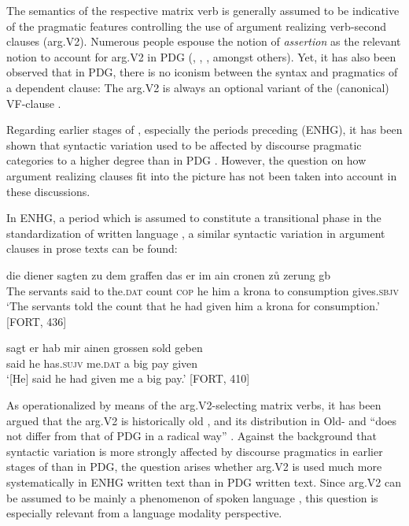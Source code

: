 \documentclass[output=paper,colorlinks,citecolor=brown]{langscibook}
\begin{document}
The semantics of the respective matrix verb is generally assumed to be indicative of the pragmatic features controlling the use of argument realizing verb-second clauses (arg.V2). Numerous people espouse the notion of \textit{assertion} as the relevant notion to account for arg.V2 in PDG (\citealt{Reis1997}, \citealt{Auer1998}, \citealt{Gärtner2002}, \citealt{Meinunger2006} amongst others). Yet, it has also been observed that in PDG, there is no iconism between the syntax and pragmatics of a dependent clause: The arg.V2 is always an optional variant of the  (canonical) VF-clause \citep{Reis1997}.

Regarding earlier stages of , especially the periods preceding  (ENHG), it has been shown that syntactic variation used to be affected by discourse pragmatic categories to a higher degree than in PDG \citep{hinterholzl2010v1, speyer2010}. However, the question on how argument realizing clauses fit into the picture has not been taken into account in these discussions.

In ENHG, a period which is assumed to constitute a transitional phase in the standardization of  written language \citep{Betten2000, polenz2000}, a similar syntactic variation in argument clauses in prose texts can be found: 

\ea
\ea \label{ex:reetz:3}
\gll die diener sagten zu dem graffen das er im ain cronen zů zerung g\oldae{}b  \\
     The servants said to the.\textsc{dat} count \textsc{cop} he him a krona to consumption gives.\textsc{sbjv}\\
\glt `The servants told the count that he had given him a krona for consumption.' \hfill [FORT, 436]

\ex \label{ex:reetz:4}
\gll sagt er hab mir ainen grossen sold geben\\
     said he has.\textsc{sujv} me.\textsc{dat} a big pay given\\
\glt `[He] said he had given me a big pay.' \hfill [FORT, 410]
\z
\z

As operationalized by means of the arg.V2-selecting matrix verbs, it has been argued that the arg.V2 is historically old \citep{Axel2012}, and its distribution in Old- and  “does not differ from that of PDG in a radical way” \citep[556]{Petrova2020a}. Against the background that syntactic variation is more strongly affected by discourse pragmatics in earlier stages of  than in PDG, the question arises whether arg.V2 is used much more systematically in ENHG written text than in PDG written text. Since arg.V2 can be assumed to be mainly a phenomenon of spoken language \citep{Auer1998}, this question is especially relevant from a language modality perspective.
\end{document}

